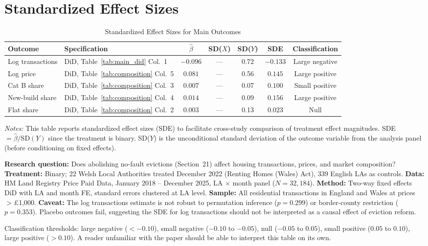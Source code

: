 \documentclass[12pt]{article}
\begin{document}
\section{Standardized Effect Sizes}
\label{sec:sde}

\begin{table}[H]
\centering
\caption{Standardized Effect Sizes for Main Outcomes}
\label{tab:sde}
\begin{adjustbox}{max width=\textwidth}
\begin{tabular}{llccccc}
\toprule
Outcome & Specification & $\hat{\beta}$ & SD($X$) & SD($Y$) & SDE & Classification \\
\midrule
Log transactions & DiD, Table~\ref{tab:main_did} Col.\ 1 & $-0.096$ & --- & 0.72 & $-0.133$ & Large negative \\
Log price & DiD, Table~\ref{tab:composition} Col.\ 5 & $0.081$ & --- & 0.56 & $0.145$ & Large positive \\
Cat B share & DiD, Table~\ref{tab:composition} Col.\ 3 & $0.007$ & --- & 0.07 & $0.100$ & Small positive \\
New-build share & DiD, Table~\ref{tab:composition} Col.\ 4 & $0.014$ & --- & 0.09 & $0.156$ & Large positive \\
Flat share & DiD, Table~\ref{tab:composition} Col.\ 2 & $0.003$ & --- & 0.13 & $0.023$ & Null \\
\bottomrule
\end{tabular}
\end{adjustbox}
\par\vspace{0.3em}
{\footnotesize \emph{Notes:} This table reports standardized effect sizes (SDE)
to facilitate cross-study comparison of treatment effect magnitudes.
SDE $= \hat{\beta} / \text{SD}(Y)$ since the treatment is binary.
SD($Y$) is the unconditional standard deviation of the outcome variable
from the analysis panel (before conditioning on fixed effects).

\textbf{Research question:} Does abolishing no-fault evictions (Section~21) affect housing transactions, prices, and market composition?
\textbf{Treatment:} Binary; 22 Welsh Local Authorities treated December 2022 (Renting Homes (Wales) Act), 339 English LAs as controls.
\textbf{Data:} HM Land Registry Price Paid Data, January 2018 -- December 2025, LA $\times$ month panel ($N = 32{,}184$).
\textbf{Method:} Two-way fixed effects DiD with LA and month FE, standard errors clustered at LA level.
\textbf{Sample:} All residential transactions in England and Wales at prices $> \pounds$1,000.
\textbf{Caveat:} The log transactions estimate is not robust to permutation inference ($p = 0.299$) or border-county restriction ($p = 0.353$). Placebo outcomes fail, suggesting the SDE for log transactions should not be interpreted as a causal effect of eviction reform.

Classification thresholds:
large negative ($< -0.10$), small negative ($-0.10$ to $-0.05$),
null ($-0.05$ to $0.05$), small positive ($0.05$ to $0.10$),
large positive ($> 0.10$).
A reader unfamiliar with the paper should be able to interpret this table on its own.}
\end{table}
\end{document}
